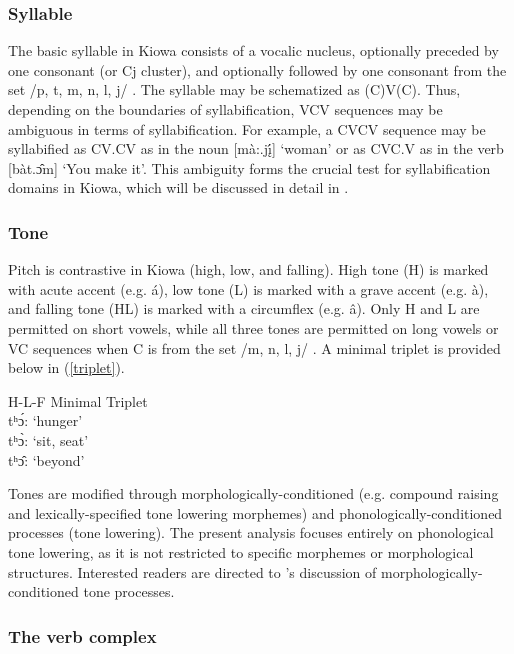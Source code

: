 \documentclass[output=paper]{langscibook}
\begin{document}
\subsubsection{Syllable} \label{sec:syllable}

The basic syllable in Kiowa consists of a vocalic nucleus, optionally preceded by one consonant (or Cj cluster), and optionally followed by one consonant from the set /p, t, m, n, l, j/ \citep[][]{Watkins:1984}. The syllable may be schematized as (C)V(C). Thus, depending on the boundaries of syllabification, VCV sequences may be ambiguous in terms of syllabification. For example, a CVCV sequence may be syllabified as CV.CV as in the noun [m\`a:.j\k{í}] `woman' or as CVC.V as in the verb [b\`at.\^{ɔ}m] `You make it'. This ambiguity forms the crucial test for syllabification domains in Kiowa, which will be discussed in detail in .

\subsubsection{Tone} \label{sec:tone}

Pitch is contrastive in Kiowa (high, low, and falling). High tone (H) is marked with acute accent (e.g. á), low tone (L) is marked with a grave accent (e.g. \`a), and falling tone (HL) is marked with a circumflex (e.g. â). Only H and L are permitted on short vowels, while all three tones are permitted on long vowels or VC sequences when C is from the set /m, n, l, j/ \citep[][]{Watkins:1984}. A minimal triplet is provided below in (\ref{triplet}).

\ea H-L-F Minimal Triplet \label{triplet} \\
tʰ\'{ɔ}: `hunger' \\
tʰ\`{ɔ}: `sit, seat' \\
tʰ\^{ɔ}: `beyond'
\z 

Tones are modified through morphologically-conditioned (e.g. compound raising and lexically-specified tone lowering morphemes) and phonologically-condi\-tioned processes (tone lowering). The present analysis focuses entirely on phonological tone lowering, as it is not restricted to specific morphemes or morphological structures. Interested readers are directed to \citet{Watkins:1984}'s discussion of morphologically-conditioned tone processes.

\subsubsection{The verb complex} \label{sec:morphosyntax}
\end{document}
